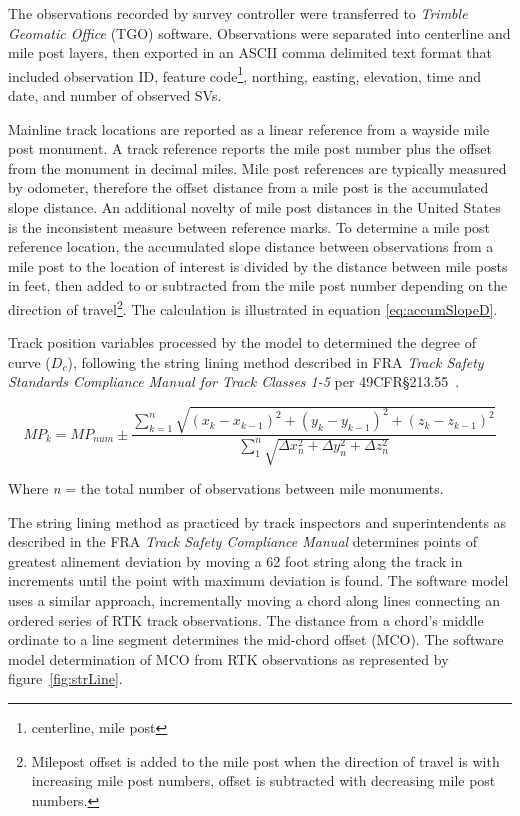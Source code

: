 The observations recorded by survey controller were transferred to \emph{Trimble Geomatic Office} (TGO) software. Observations were separated into centerline and mile post layers, then exported in an ASCII comma delimited text format that included observation ID, feature code\footnote{centerline, mile post}, northing, easting, elevation, time and date, and number of observed SVs.

Mainline track locations are reported as a linear reference from a wayside mile post monument. A track reference reports the mile post number plus the offset from the monument in decimal miles. Mile post references are typically measured by odometer, therefore the offset distance from a mile post is the accumulated slope distance. An additional novelty of mile post distances in the United States is the inconsistent measure between reference marks. To determine a mile post reference location, the accumulated slope distance between observations from a mile post to the location of interest is divided by the distance between mile posts in feet, then added to or subtracted from the mile post number depending on the direction of travel\footnote{Milepost offset is added to the mile post when the direction of travel is with increasing mile post numbers, offset is subtracted with decreasing mile post numbers.}. The calculation is illustrated in equation \ref{eq:accumSlopeD}.


Track position variables processed by the model to determined the degree of curve (${D_c}$), following the string lining method described in FRA \emph{Track Safety Standards Compliance Manual for Track Classes 1-5} per 49CFR\S213.55~\citep{2007FRATrack}.

\begin{equation}
	MP_{k} =  MP_{num} \pm \frac{\displaystyle {\sum_{k=1}^n {\sqrt{(x_k - x_{k-1})^2 +( y_k - y_{k-1})^2 +( z_k - z_{k-1})^2}}}}{\displaystyle{\sum_1 ^n \sqrt{\Delta x_n^2 + \Delta y_n^2 + \Delta z_n^2}}}
	\label{eq:accumSlopeD}
\end{equation}
\begin{flushright}
Where \emph{n} = the total number of observations between mile monuments.
\end{flushright}

The string lining method as practiced by track inspectors and superintendents as described in the FRA \emph{Track Safety Compliance Manual} determines points of greatest alinement deviation by moving a 62 foot string along the track in increments until the point with maximum deviation is found. The software model uses a similar approach, incrementally moving a chord along lines connecting an ordered series of RTK track observations. The distance from a chord's middle ordinate to a line segment  determines the mid-chord offset (MCO). The software model determination of MCO from RTK observations as represented by figure~\ref{fig:strLine}.

